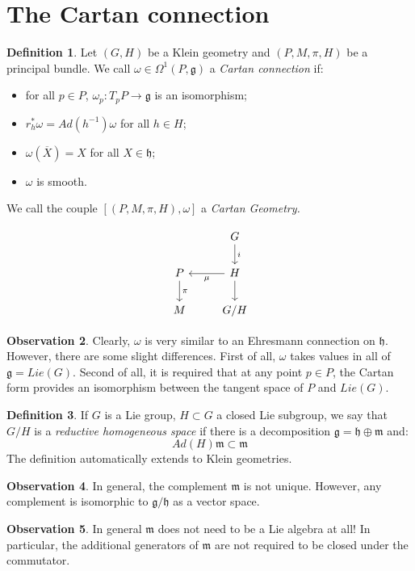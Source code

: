 \documentclass[12pt,a4paper]{report}
\theoremstyle{definition}
\newtheorem{Def}{Definition}[chapter]
\theoremstyle{Theorem}
\theoremstyle{definition}
\theoremstyle{definition}
\newtheorem{Obs}[Def]{Observation}
\begin{document}
		\section{The Cartan connection}
		\begin{Def}
			Let $(G,H)$ be a Klein geometry and $(P,M,\pi,H)$ be a principal bundle. We call $\omega\in\Omega^1(P,\mathfrak{g})$ a \textit{Cartan connection} if:
			\begin{itemize}
				\item for all $p\in P$, $\omega_p:T_pP\rightarrow \mathfrak{g}$ is an isomorphism;
				\item $r_h^*\omega=Ad(h^{-1})\omega$ for all $h\in H$;
				\item $\omega(\overline{X})=X$ for all $X\in \mathfrak{h}$;
				\item $\omega$ is smooth.
			\end{itemize}
			We call the couple $[(P,M,\pi,H),\omega]$ a \textit{Cartan Geometry.}
		\end{Def}
		$$\begin{tikzcd}
			& G \arrow{d}{i}\\
			P \arrow{d}{\pi} & H \arrow{l}{\mu} \arrow{d}\\
			M & G/H
		\end{tikzcd}$$
		\begin{Obs}
			Clearly, $\omega$ is very similar to an Ehresmann connection on $\mathfrak{h}$. However, there are some slight differences. First of all, $\omega$ takes values in all of $\mathfrak{g}=Lie(G)$. Second of all, it is required that at any point $p\in P$, the Cartan form provides an isomorphism between the tangent space of $P$ and $Lie(G)$.
		\end{Obs}
		\begin{Def}
			If $G$ is a Lie group, $H\subset G$ a closed Lie subgroup, we say that $G/H$ is a \textit{reductive homogeneous space} if there is a decomposition $\mathfrak{g}=\mathfrak{h}\oplus\mathfrak{m}$ and:
			$$Ad(H)\mathfrak{m}\subset \mathfrak{m}$$
			The definition automatically extends to Klein geometries. 
		\end{Def}
		\begin{Obs}
			In general, the complement $\mathfrak{m}$ is not unique. However, any complement is isomorphic to $\mathfrak{g/h}$ as a vector space.
		\end{Obs}
		\begin{Obs}
			In general $\mathfrak{m}$ does not need to be a Lie algebra at all! In particular, the additional generators of $\mathfrak{m}$ are not required to be closed under the commutator.
		\end{Obs}
\end{document}

